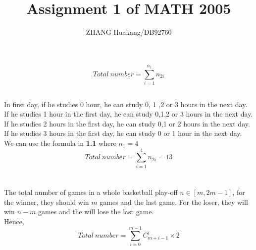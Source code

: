 \documentclass{article}
\title{Assignment 1 of MATH 2005}
\author{ZHANG Huakang/DB92760}
\begin{document}
    \maketitle
    \section{}
        \subsection{}
        
                $$Total \ number= \sum _{i=1}^{n_1}n_{2i}$$
            
        \subsection{}
                In first day, if he studies 0 hour, he can study 0, 1 ,2 or 3 hours in the  next day.
                \\
                If he studies 1 hour in the first day, he can study 0,1,2 or 3 hours in the next day.
                \\
                If he studies 2 hours in the first day, he can study 0,1 or 2 hours in the next day.
                \\
                If he studies 3 hours in the first day, he can study 0 or 1 hour in the next day.
                \\
                We can use the formula in \textbf{1.1} where $n_1=4$
                $$Total \ number= \sum _{i=1}^{4}n_{2i}=13$$
              

    \section{}
        \subsection{}
                The total number of games in a whole basketball play-off $ n\in [m,2m-1]$, for the winner, they should win $m$ games and the last game. For the loser, they will win $n-m$ games and the will lose the last game.
                \\
                Hence, 
                $$Total\ number=\sum _{i=0} ^{m-1} C_{m+i-1} ^{i} \times 2$$
                
\end{document}
